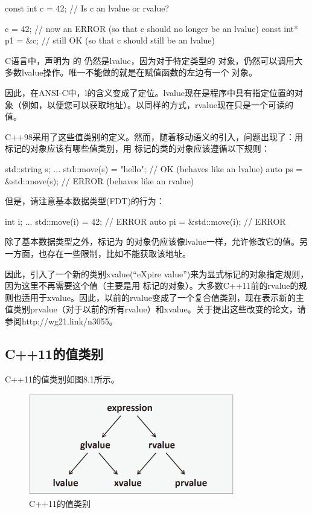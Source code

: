 \begin{cppcode}
const int c = 42; // Is c an lvalue or rvalue?

c = 42; // now an ERROR (so that c should no longer be an lvalue)
const int* p1 = &c; // still OK (so that c should still be an lvalue)
\end{cppcode}

C语言中，声明为  的  仍然是lvalue，因为对于特定类型的  对象，仍然可以调用大多数lvalue操作。唯一不能做的就是在赋值函数的左边有一个  对象。

因此，在ANSI-C中，l的含义变成了定位。lvalue现在是程序中具有指定位置的对象（例如，以便您可以获取地址）。以同样的方式，rvalue现在只是一个可读的值。

C++98采用了这些值类别的定义。然而，随着移动语义的引入，问题出现了：用  标记的对象应该有哪些值类别，用  标记的类的对象应该遵循以下规则：

\begin{cppcode}
std::string s;
...
std::move(s) = "hello"; // OK (behaves like an lvalue)
auto ps = &std::move(s); // ERROR (behaves like an rvalue)
\end{cppcode}

但是，请注意基本数据类型(FDT)的行为：

\begin{cppcode}
int i;
...
std::move(i) = 42; // ERROR
auto pi = &std::move(i); // ERROR
\end{cppcode}

除了基本数据类型之外，标记为  的对象仍应该像lvalue一样，允许修改它的值。另一方面，也存在一些限制，比如不能获取该地址。

因此，引入了一个新的类别xvalue(“eXpire value”)来为显式标记的对象指定规则，因为这里不再需要这个值（主要是用  标记的对象）。大多数C++11前的rvalue的规则也适用于xvalue。因此，以前的rvalue变成了一个复合值类别，现在表示新的主值类别prvalue（对于以前的所有rvalue）和xvalue。关于提出这些改变的论文，请参阅http://wg21.link/n3055。

\subsection{C++11的值类别}

C++11的值类别如图8.1所示。

\begin{figure}
	\includegraphics[width=0.8\textwidth]{part1/ch8/images/1}
	\caption{C++11的值类别}
\end{figure}

